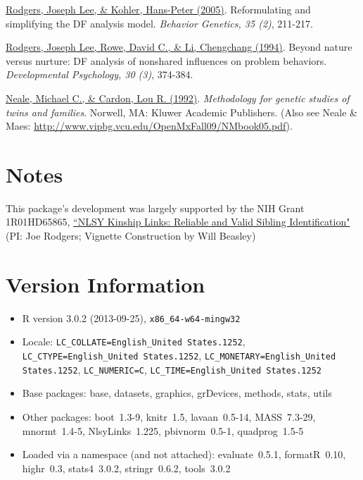 \documentclass{article}\usepackage[]{graphicx}\usepackage[]{color}
\begin{document}
\href{http://www.springerlink.com/content/n3x1v1q282583366}{Rodgers, Joseph Lee, \& Kohler, Hans-Peter (2005)}. Reformulating and simplifying the DF analysis model. \emph{Behavior Genetics, 35 (2)}, 211-217.

\href{http://psycnet.apa.org/journals/dev/30/3/374/}{Rodgers, Joseph Lee, Rowe, David C., \& Li, Chengchang (1994)}. Beyond nature versus nurture: DF analysis of nonshared influences on problem behaviors. \emph{Developmental Psychology, 30 (3)}, 374-384. 

\href{http://books.google.com/books/about/Methodology_for_genetic_studies_of_twins.html?id=vVzDmDv6WDkC}{Neale, Michael C., \& Cardon, Lou R. (1992)}. \emph{Methodology for genetic studies of twins and families}. Norwell, MA: Kluwer Academic Publishers. (Also see Neale \& Maes: \url{http://www.vipbg.vcu.edu/OpenMxFall09/NMbook05.pdf}).
 
\section{Notes}
This package's development was largely supported by the NIH Grant 1R01HD65865, \href{http://taggs.hhs.gov/AwardDetail.cfm?s_Award_Num=R01HD065865&n_Prog_Office_Code=50}{``NLSY Kinship Links: Reliable and Valid Sibling Identification"} (PI: Joe Rodgers; Vignette Construction by Will Beasley)

\section{Version Information}
\begin{itemize}\raggedright
  \item R version 3.0.2 (2013-09-25), \verb|x86_64-w64-mingw32|
  \item Locale: \verb|LC_COLLATE=English_United States.1252|, \verb|LC_CTYPE=English_United States.1252|, \verb|LC_MONETARY=English_United States.1252|, \verb|LC_NUMERIC=C|, \verb|LC_TIME=English_United States.1252|
  \item Base packages: base, datasets, graphics, grDevices, methods, stats,
    utils
  \item Other packages: boot~1.3-9, knitr~1.5, lavaan~0.5-14, MASS~7.3-29,
    mnormt~1.4-5, NlsyLinks~1.225, pbivnorm~0.5-1, quadprog~1.5-5
  \item Loaded via a namespace (and not attached): evaluate~0.5.1,
    formatR~0.10, highr~0.3, stats4~3.0.2, stringr~0.6.2, tools~3.0.2
\end{itemize}



\end{document}
